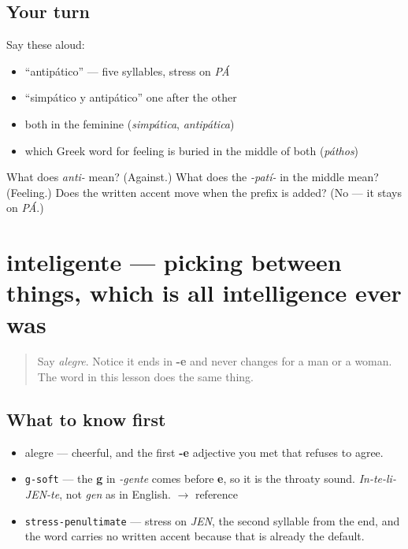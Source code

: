 \subsection*{Your turn}
Say these aloud:

\begin{itemize}
\raggedright
  \item \textquotedblleft{}antipático\textquotedblright{} — five syllables, stress on \emph{PÁ}
  \item \textquotedblleft{}simpático y antipático\textquotedblright{} one after the other
  \item both in the feminine (\emph{simpática}, \emph{antipática})
  \item which Greek word for feeling is buried in the middle of both (\emph{páthos})
\end{itemize}

\begin{tcolorbox}[breakable,colback=teal!4,colframe=teal!35!black,title={Before you move on}]
What does \emph{anti-} mean? (Against.) What does the \emph{-patí-} in the middle mean? (Feeling.) Does the written accent move when the prefix is added? (No — it stays on \emph{PÁ}.)
\end{tcolorbox}
\section[inteligente]{inteligente — picking between things, which is all intelligence ever was}

\label{lesson:ES-C423-inteligente}



\begin{quote}
Say \emph{alegre}. Notice it ends in \textbf{-e} and never changes for a man or a woman. The word in this lesson does the same thing.
\end{quote}

\subsection*{What to know first}
\begin{itemize}
\raggedright
  \item alegre — cheerful, and the first \textbf{-e} adjective you met that refuses to agree.
\end{itemize}

\begin{sounds}
\begin{itemize}
\raggedright
  \item \texttt{g-soft} — the \textbf{g} in \emph{-gente} comes before \textbf{e}, so it is the throaty sound. \emph{In-te-li-JEN-te}, not \emph{gen} as in English. $\to$ reference
  \item \texttt{stress-penultimate} — stress on \emph{JEN}, the second syllable from the end, and the word carries no written accent because that is already the default.
\end{itemize}
\end{sounds}

